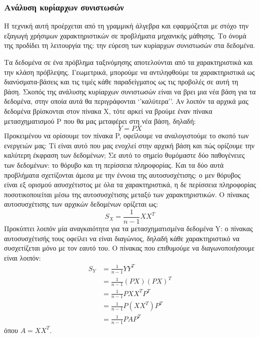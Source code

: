 \subsubsection{Ανάλυση κυρίαρχων συνιστωσών}
Η τεχνική αυτή προέρχεται από τη γραμμική άλγεβρα και εφαρμόζεται με στόχο την εξαγωγή χρήσιμων χαρακτηριστικών σε προβλήματα μηχανικής μάθησης. Το όνομά της προδίδει τη λειτουργία της: την εύρεση των κυρίαρχων συνιστωσών στα δεδομένα.

Τα δεδομένα σε ένα πρόβλημα ταξινόμησης αποτελούνται από τα χαρακτηριστικά και την κλάση πρόβλεψης. Γεωμετρικά, μπορούμε να αντιληφθούμε τα χαρακτηριστικά ως διανύσματα-βάσεις και τις τιμές κάθε παραδείγματος ως τις προβολές σε αυτή τη βάση. Σκοπός της ανάλυσης κυρίαρχων συνιστωσών είναι να βρει μια νέα βάση για τα δεδομένα, στην οποία αυτά θα περιγράφονται ‘’καλύτερα’’. Αν λοιπόν τα αρχικά μας δεδομένα βρίσκονται στον πίνακα Χ, τότε αρκεί να βρούμε έναν πίνακα μετασχηματισμού P που θα μας μεταφέρει στη νέα βάση, δηλαδή:
\begin{equation}
 Y=P X
\end{equation}
Προκειμένου να ορίσουμε τον πίνακα P, οφείλουμε να αναλογιστούμε το σκοπό των ενεργειών μας: Τί είναι αυτό που μας ενοχλεί στην αρχική βάση και πώς ορίζουμε την καλύτερη έκφραση των δεδομένων; Σε αυτό το σημείο θυμόμαστε δύο παθογένειες των δεδομένων: το θόρυβο και τη περίσσεια πληροφορίας. Και τα δύο αυτά προβλήματα σχετίζονται άμεσα με την έννοια της αυτοσυσχέτισης: ο μεν θόρυβος είναι εξ ορισμού ασυσχέτιστος με όλα τα χαρακτηριστικά, η δε περίσσεια πληροφορίας ποσοτικοποιείται μέσω της αυτοσυσχέτισης μεταξύ των χαρακτηριστικών. Ο πίνακας αυτοσυσχέτισης των αρχικών δεδομένων ορίζεται ως:
\begin{equation} 
S_X=\frac{1}{n-1} X X^T
\end{equation}
Προκύπτει λοιπόν μία αναγκαιότητα για τα μετασχηματισμένα δεδομένα Y: ο πίνακας αυτοσυσχέτισής τους οφείλει να είναι διαγώνιος, δηλαδή κάθε χαρακτηριστικό να συσχετίζεται μόνο με τον εαυτό του. Ο πίνακας που επιθυμούμε να διαγωνοποιήσουμε είναι λοιπόν:
\begin{equation} 
\begin{split}
S_Y & = \frac{1}{n-1} Y Y^T \\
& = \frac{1}{n-1} (PX)(PX)^T \\
& = \frac{1}{n-1} PXX^TP^T\\
& = \frac{1}{n-1} P(XX^T)P^T\\
& = \frac{1}{n-1} PAP^T
\end{split}
\end{equation}
όπου $A=XX^T$.

